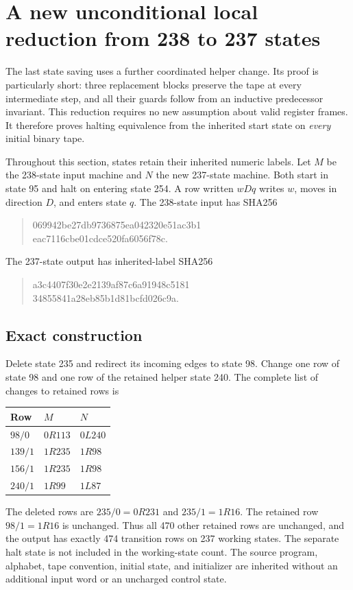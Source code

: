 \section{A new unconditional local reduction from 238 to 237 states}
\label{sec:local237}

The last state saving uses a further coordinated helper change.  Its proof is
particularly short: three replacement blocks preserve the tape at every
intermediate step, and all their guards follow from an inductive predecessor
invariant.  This reduction requires no new assumption about valid register
frames.  It therefore proves halting equivalence from the inherited start state
on \emph{every} initial binary tape.

Throughout this section, states retain their inherited numeric labels.
Let $M$ be the 238-state input machine and $N$ the new 237-state machine.
Both start in state 95 and halt on entering state 254.  A row written
$wDq$ writes $w$, moves in direction $D$, and enters state $q$.
The 238-state input has SHA256
\begin{quote}\small\ttfamily
069942be27db9736875ea042320e51ac3b1\\
eac7116cbe01cdce520fa6056f78c.
\end{quote}
The 237-state output has inherited-label SHA256
\begin{quote}\small\ttfamily
a3c4407f30e2e2139af87c6a91948c5181\\
34855841a28eb85b1d81bcfd026c9a.
\end{quote}

\subsection{Exact construction}

Delete state 235 and redirect its incoming edges to state 98.  Change one row
of state 98 and one row of the retained helper state 240.  The complete list
of changes to retained rows is
\begin{center}
\begin{tabular}{@{}lll@{}}
\toprule
Row & $M$ & $N$\\
\midrule
$98/0$ & $0R113$ & $0L240$\\
$139/1$ & $1R235$ & $1R98$\\
$156/1$ & $1R235$ & $1R98$\\
$240/1$ & $1R99$ & $1L87$\\
\bottomrule
\end{tabular}
\end{center}
The deleted rows are $235/0=0R231$ and $235/1=1R16$.
The retained row $98/1=1R16$ is unchanged.  Thus all 470 other retained rows
are unchanged, and the output has exactly 474 transition rows on 237 working
states.  The separate halt state is not included in the working-state count.
The source program, alphabet, tape convention, initial state, and initializer
are inherited without an additional input word or an uncharged control state.

